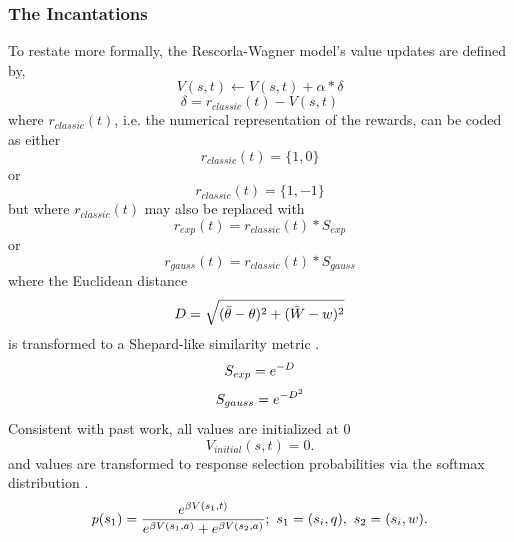\documentclass[doc,12pt]{apa}        %
\begin{document}
\subsubsection{The Incantations}
\label{subsub:incantations}
To restate more formally, the Rescorla-Wagner model's value updates are defined by,
\begin{equation} \label{eq:V} V(s,t) \leftarrow V(s,t) + \alpha*\delta \end{equation} 
\begin{equation} \label{eq:rpe} \delta = r_{classic}(t) - V(s,t) \end{equation}
where $r_{classic}(t)$, i.e. the numerical representation of the rewards, can be coded as either
\begin{equation}
	\label{eq:r1}
	r_{classic}(t) = \{1,0\}
\end{equation}
or 
\begin{equation}
	\label{eq:r2}
	r_{classic}(t) = \{1,-1\}
\end{equation}
but where $r_{classic}(t)$ may also be replaced with
\begin{equation}
	\label{eq:re}
    r_{exp}(t) = r_{classic}(t) * S_{exp}
\end{equation}
or
\begin{equation}
	\label{eq:rg}
    r_{gauss}(t) = r_{classic}(t) * S_{gauss}
\end{equation}
where the Euclidean distance
\begin{equation}
	\label{eq:D}\\
    D = \sqrt{(\bar{\theta} - \theta)^2 + (\bar{W}-w)^2}
\end{equation}
is transformed to a Shepard-like similarity metric \cite{Shepard:1987p9102}.
\begin{equation}
	\label{eq:Sexp}\\
    S_{exp} = e^{-D}
\end{equation}
\begin{equation}
	\label{eq:Sgauss}\\
    S_{gauss} = e^{-D^2}
\end{equation}
Consistent with past work, all values are initialized at 0 \cite{Beierholm:2011p8141,BischoffGrethe:2009p4570,Gershman:2009p7207}
\begin{equation} \label{eq:V0} V_{initial}(s,t) = 0. \end{equation}
and values are transformed to response selection probabilities via the softmax distribution \cite{Sutton:1998p9247,ODoherty:2003p6329}.
\begin{equation}
	\label{eq:softmax}
	p(s_1) = {e^{\beta V(s_1,t)}\over{e^{\beta V(s_1,a)} + e^{\beta V(s_2,a)}}};\ s_1 = (s_{i},q), \ s_2 = (s_{i}, w).
\end{equation}
\end{document}

